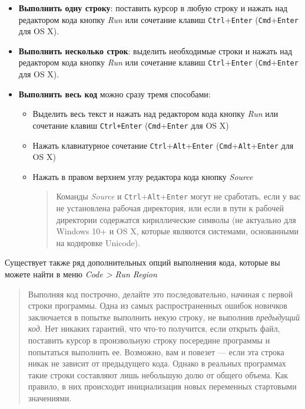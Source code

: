 \documentclass[]{book}
\providecommand{\tightlist}{%
  \setlength{\itemsep}{0pt}\setlength{\parskip}{0pt}}
\begin{document}
\begin{itemize}
\tightlist
\item
  \textbf{Выполнить одну строку}: поставить курсор в любую строку и
  нажать над редактором кода кнопку \emph{Run} или сочетание клавиш
  \texttt{Ctrl}+\texttt{Enter} (\texttt{Cmd}+\texttt{Enter} для OS X).
\item
  \textbf{Выполнить несколько строк}: выделить необходимые строки и
  нажать над редактором кода кнопку \emph{Run} или сочетание клавиш
  \texttt{Ctrl}+\texttt{Enter} (\texttt{Cmd}+\texttt{Enter} для OS X).
\item
  \textbf{Выполнить весь код} можно сразу тремя способами:

  \begin{itemize}
  \item
    Выделить весь текст и нажать над редактором кода кнопку \emph{Run}
    или сочетание клавиш \texttt{Ctrl+Enter}
    (\texttt{Cmd}+\texttt{Enter} для OS X)
  \item
    Нажать клавиатурное сочетание
    \texttt{Ctrl}+\texttt{Alt}+\texttt{Enter}
    (\texttt{Cmd}+\texttt{Alt}+\texttt{Enter} для OS X)
  \item
    Нажать в правом верхнем углу редактора кода кнопку \emph{Source}

    \begin{quote}
    Команды \emph{Source} и \texttt{Ctrl}+\texttt{Alt}+\texttt{Enter}
    могут не сработать, если у вас не установлена рабочая директория,
    или если в пути к рабочей директории содержатся кириллические
    символы (не актуально для Windows 10+ и OS X, которые являются
    системами, основанными на кодировке Unicode).
    \end{quote}
  \end{itemize}
\end{itemize}

Существует также ряд дополнительных опций выполнения кода, которые вы
можете найти в меню \emph{Code \textgreater{} Run Region}

\begin{quote}
Выполняя код построчно, делайте это последовательно, начиная с первой
строки программы. Одна из самых распространенных ошибок новичков
заключается в попытке выполнить некую строку, не выполнив
\emph{предыдущий код}. Нет никаких гарантий, что что-то получится, если
открыть файл, поставить курсор в произвольную строку посередине
программы и попытаться выполнить ее. Возможно, вам и повезет --- если
эта строка никак не зависит от предыдущего кода. Однако в реальных
программах такие строки составляют лишь небольшую долю от общего объема.
Как правило, в них происходит инициализация новых переменных стартовыми
значениями.
\end{quote}
\end{document}
